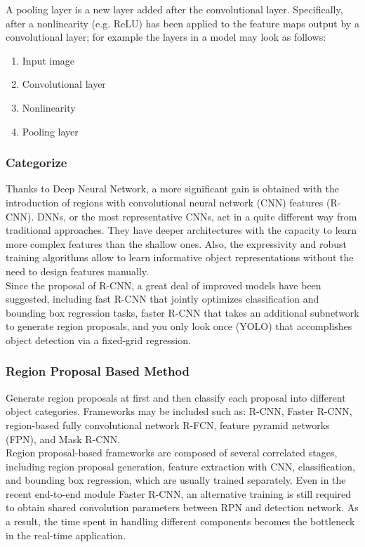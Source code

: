             \vspace{3mm}
            A pooling layer is a new layer added after the convolutional layer. Specifically, after a nonlinearity (e.g. ReLU) has been applied to the feature maps output by a convolutional layer; for example the layers in a model may look as follows: \\
                \begin{enumerate}
                    \item Input image
                    \item Convolutional layer
                    \item Nonlinearity
                    \item Pooling layer
                \end{enumerate}

        \subsubsection{Categorize}
            Thanks to Deep Neural Network, a more significant gain is obtained with the introduction of regions with convolutional neural network (CNN) features (R-CNN). DNNs, or the most representative CNNs, act in a quite different way from traditional approaches. They have deeper architectures with the capacity to learn more complex features than the shallow ones. Also, the expressivity and robust training algorithms allow to learn informative object representations without the need to design features manually. \\
            \vspace{3mm}
            Since the proposal of R-CNN, a great deal of improved models have been suggested, including fast R-CNN that jointly optimizes classification and bounding box regression tasks, faster R-CNN that takes an additional subnetwork to generate region proposals, and you only look once (YOLO) that accomplishes object detection via a fixed-grid regression. \\

        \subsubsection{Region Proposal Based Method}
            Generate region proposals at first and then classify each proposal into different object categories. Frameworks may be included such as: R-CNN, Faster R-CNN, region-based fully convolutional network R-FCN, feature pyramid networks (FPN), and Mask R-CNN. \\
            \vspace{3mm}
            Region proposal-based frameworks are composed of several correlated stages, including region proposal generation, feature extraction with CNN, classification, and bounding box regression, which are usually trained separately. Even in the recent end-to-end module Faster R-CNN, an alternative training is still required to obtain shared convolution parameters between RPN and detection network. As a result, the time spent in handling different components becomes the bottleneck in the real-time application. \\

